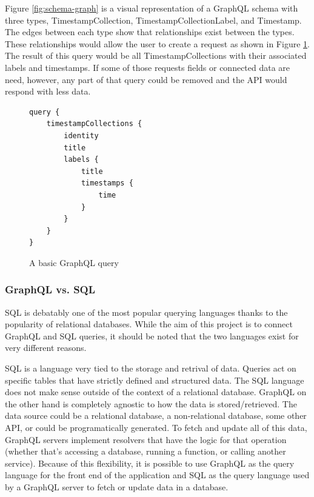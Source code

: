 Figure \ref{fig:schema-graph} is a visual representation of a GraphQL schema with three types, TimestampCollection, TimestampCollectionLabel, and Timestamp.  The edges between each type show that relationships exist between the types. These relationships  would allow the user to create a request as shown in Figure \ref{fig:basic-query}.  The result of this query would be all TimestampCollections with their associated labels and timestamps.  If some of those requests fields or connected data are need, however, any part of that query could be removed and the API would respond with less data.

\begin{figure}
    \begin{verbatim}
query {
    timestampCollections {
        identity
        title
        labels {
            title
            timestamps {
                time
            }
        }
    }
}
    \end{verbatim}
    \caption{A basic GraphQL query}
    \label{fig:basic-query}
\end{figure}

\subsubsection{GraphQL vs. SQL}

SQL is debatably one of the most popular querying languages thanks to the popularity of relational databases.  While the aim of this project is to connect GraphQL and SQL queries, it should be noted that the two languages exist for very different reasons.

SQL is a language very tied to the storage and retrival of data.  Queries act on specific tables that have strictly defined and structured data.  The SQL language does not make sense outside of the context of a relational database.  GraphQL on the other hand is completely agnostic to how the data is stored/retrieved.  The data source could be a relational database, a non-relational database, some other API, or could be programatically generated. To fetch and update all of this data, GraphQL servers implement resolvers that have the logic for that operation (whether that's accessing a database, running a function, or calling another service).  Because of this flexibility, it is possible to use GraphQL as the query language for the front end of the application and SQL as the query language used by a GraphQL server to fetch or update data in a database.